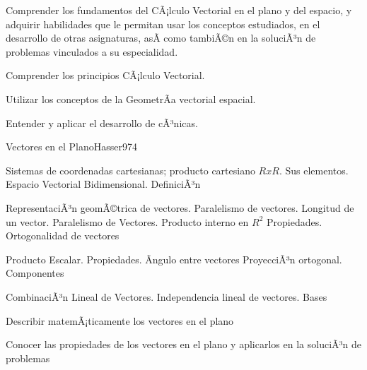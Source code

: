 \begin{syllabus}


\begin{justification}
Comprender los fundamentos del CÃ¡lculo Vectorial en el plano y del espacio, y adquirir habilidades que le permitan usar los conceptos estudiados, en el desarrollo de otras asignaturas, asÃ­ como tambiÃ©n en la soluciÃ³n de problemas vinculados a su especialidad.
\end{justification}

\begin{goals}
\item Comprender los principios CÃ¡lculo Vectorial.
\item Utilizar los conceptos de la GeometrÃ­a vectorial espacial.
\item Entender y aplicar el desarrollo de cÃ³nicas.
\end{goals}

\begin{outcomes}
\end{outcomes}

\begin{unit}{Vectores en el Plano}{Hasser97}{4}
   \begin{topics}
      \item Sistemas de coordenadas cartesianas; producto cartesiano $RxR$. Sus elementos. Espacio Vectorial Bidimensional. DefiniciÃ³n
      \item RepresentaciÃ³n geomÃ©trica de vectores. Paralelismo de vectores. Longitud de un  vector. Paralelismo de Vectores. Producto interno en $R^2$ Propiedades. Ortogonalidad de vectores
      \item Producto Escalar. Propiedades. Ãngulo entre vectores ProyecciÃ³n ortogonal. Componentes
      \item CombinaciÃ³n Lineal de Vectores. Independencia lineal de vectores. Bases
   \end{topics}

   \begin{unitgoals}
      \item Describir matemÃ¡ticamente los vectores en el plano
      \item Conocer las propiedades de los vectores en el plano y aplicarlos en la soluciÃ³n de problemas
   \end{unitgoals}
\end{unit}


\end{syllabus}
